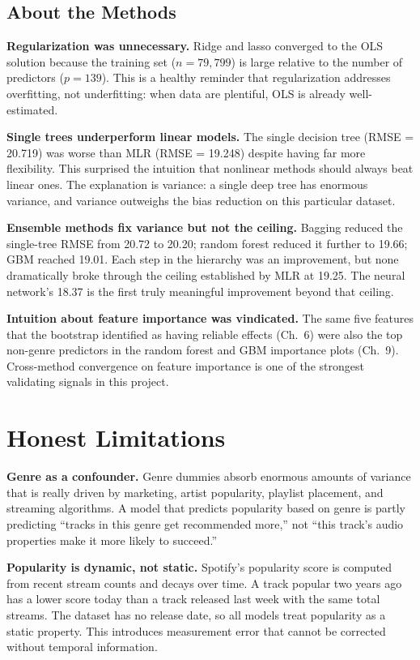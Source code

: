 \documentclass[12pt, oneside]{book}
\begin{document}
\subsection{About the Methods}
 
\textbf{Regularization was unnecessary.} Ridge and lasso converged to the OLS solution because the training set ($n = 79{,}799$) is large relative to the number of predictors ($p = 139$). This is a healthy reminder that regularization addresses overfitting, not underfitting: when data are plentiful, OLS is already well-estimated.
 
\textbf{Single trees underperform linear models.} The single decision tree (RMSE = 20.719) was worse than MLR (RMSE = 19.248) despite having far more flexibility. This surprised the intuition that nonlinear methods should always beat linear ones. The explanation is variance: a single deep tree has enormous variance, and variance outweighs the bias reduction on this particular dataset.
 
\textbf{Ensemble methods fix variance but not the ceiling.} Bagging reduced the single-tree RMSE from 20.72 to 20.20; random forest reduced it further to 19.66; GBM reached 19.01. Each step in the hierarchy was an improvement, but none dramatically broke through the ceiling established by MLR at 19.25. The neural network's 18.37 is the first truly meaningful improvement beyond that ceiling.
 
\textbf{Intuition about feature importance was vindicated.} The same five features that the bootstrap identified as having reliable effects (Ch.\ 6) were also the top non-genre predictors in the random forest and GBM importance plots (Ch.\ 9). Cross-method convergence on feature importance is one of the strongest validating signals in this project.
 
\section{Honest Limitations}
 
\textbf{Genre as a confounder.} Genre dummies absorb enormous amounts of variance that is really driven by marketing, artist popularity, playlist placement, and streaming algorithms. A model that predicts popularity based on genre is partly predicting ``tracks in this genre get recommended more,'' not ``this track's audio properties make it more likely to succeed.''
 
\textbf{Popularity is dynamic, not static.} Spotify's popularity score is computed from recent stream counts and decays over time. A track popular two years ago has a lower score today than a track released last week with the same total streams. The dataset has no release date, so all models treat popularity as a static property. This introduces measurement error that cannot be corrected without temporal information.
 
\end{document}
